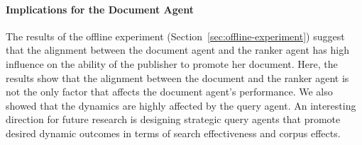 \paragraph{Implications for the Document Agent}
The results of the offline experiment (Section~\ref{sec:offline-experiment}) suggest that the alignment between the document agent and the ranker agent has high influence on the ability of the publisher to promote her document. Here, the results show that the alignment between the document and the ranker agent is not the only factor that affects the document agent's performance. 
We also showed that the dynamics are highly affected by the query agent. 
An interesting direction for future research is designing strategic query agents that promote desired dynamic outcomes in terms of search effectiveness and corpus effects.
